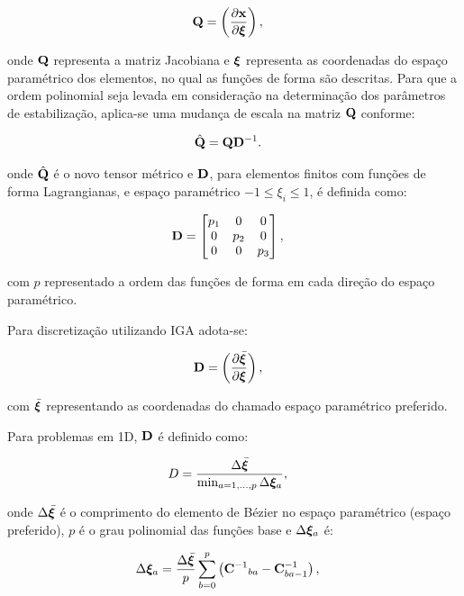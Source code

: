 \documentclass[tese_patricia]{subfiles}%
\begin{document}
\begin{align}
\mathbf{Q}&=\left(\frac{\partial\mathbf{x}}{\partial\bm{\xi}}\right),
\end{align}

\noindent onde $\mathbf{Q}$ representa a matriz Jacobiana e $\bm{\xi}$ representa as coordenadas do espaço paramétrico dos elementos, no qual as funções de forma são descritas. Para que a ordem polinomial seja levada em consideração na determinação dos parâmetros de estabilização, aplica-se uma mudança de escala na matriz $\mathbf{Q}$ conforme:

\begin{align}
\hat{\mathbf{Q}}&=\mathbf{Q}\mathbf{D}^{-1}.
\end{align}

\noindent onde $\hat{\mathbf{Q}}$ é o novo tensor métrico e $\mathbf{D}$, para elementos finitos com funções de forma Lagrangianas, e espaço paramétrico $-1\leq\xi_i\leq1$, é definida como:

\begin{align}
\mathbf{D}&=\begin{bmatrix}
p_{1} & 0 & 0\\
0 & p_{2} & 0 \\
0 & 0 & p_{3}
\end{bmatrix},
\end{align}

\noindent com $p$ representado a ordem das funções de forma em cada direção do espaço paramétrico. 

Para discretização utilizando IGA adota-se:

\begin{align}
\mathbf{D}&=\left(\frac{\partial\bar{\bm{\xi}}}{\partial\bm{\xi}}\right),
\end{align}

\noindent com $\bar{\bm{\xi}}$ representando as coordenadas do chamado espaço paramétrico preferido. 

Para problemas em 1D, $\mathbf{D}$ é definido como:

\begin{align}
D&=\frac{\Delta\bar{\bm{\xi}}}{\min_{a=1,...,p} \Delta\bm{\xi}_{a}},
\end{align}

\noindent onde $\Delta\bar{\bm{\xi}}$ é o comprimento do elemento de Bézier no espaço paramétrico (espaço preferido), $p$ é o grau polinomial das funções base e $\Delta\bm{\xi}_{a}$ é:

\begin{align}
\Delta\bm{\xi}_{a}&=\frac{\Delta\bar{\bm{\xi}}}{p}\sum_{b=0}^{p} \left({\mathbf{C}^{-1}}_{ba} - \mathbf{C}^{-1}_{ba-1}\right),
\end{align}
\end{document}
